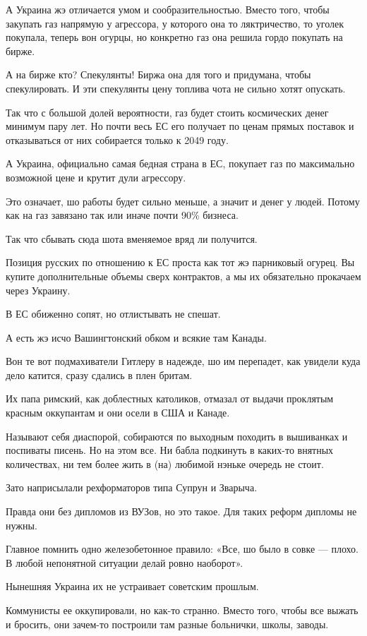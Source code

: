 \begin{multicols}{2}
А Украина жэ отличается умом и сообразительностью. Вместо того, чтобы закупать
газ напрямую у агрессора, у которого она то ляктричество, то уголек покупала,
теперь вон огурцы, но конкретно газ она решила гордо покупать на бирже.

А на бирже кто? Спекулянты! Биржа она для того и придумана, чтобы
спекулировать. И эти спекулянты цену топлива чота не сильно хотят опускать.

Так что с большой долей вероятности, газ будет стоить космических денег минимум
пару лет. Но почти весь ЕС его получает по ценам прямых поставок и отказываться
от них собирается только к 2049 году.

А Украина, официально самая бедная страна в ЕС, покупает газ по максимально
возможной цене и крутит дули агрессору.

Это означает, шо работы будет сильно меньше, а значит и денег у людей. Потому
как на газ завязано так или иначе почти 90\% бизнеса.

Так что сбывать сюда шота вменяемое вряд ли получится.

Позиция русских по отношению к ЕС проста как тот жэ парниковый огурец. Вы
купите дополнительные объемы сверх контрактов, а мы их обязательно прокачаем
через Украину.

В ЕС обиженно сопят, но отлистывать не спешат.

А есть жэ исчо Вашингтонский обком и всякие там Канады.

Вон те вот подмахиватели Гитлеру в надежде, шо им перепадет, как увидели куда
дело катится, сразу сдались в плен бритам.

Их папа римский, как доблестных католиков, отмазал от выдачи проклятым красным
оккупантам и они осели в США и Канаде.

Называют себя диаспорой, собираются по выходным походить в вышиванках и
поспиваты писень. Но на этом все. Ни бабла подкинуть в каких-то внятных
количествах, ни тем более жить в (на) любимой нэньке очередь не стоит.

Зато наприсылали рехформаторов типа Супрун и Зварыча.

Правда они без дипломов из ВУЗов, но это такое. Для таких реформ дипломы не
нужны.

Главное помнить одно железобетонное правило: «Все, шо было в совке — плохо. В
любой непонятной ситуации делай ровно наоборот».

Нынешняя Украина их не устраивает советским прошлым.

Коммунисты ее оккупировали, но как-то странно. Вместо того, чтобы все выжать и
бросить, они зачем-то построили там разные больнички, школы, заводы.


\end{multicols}
